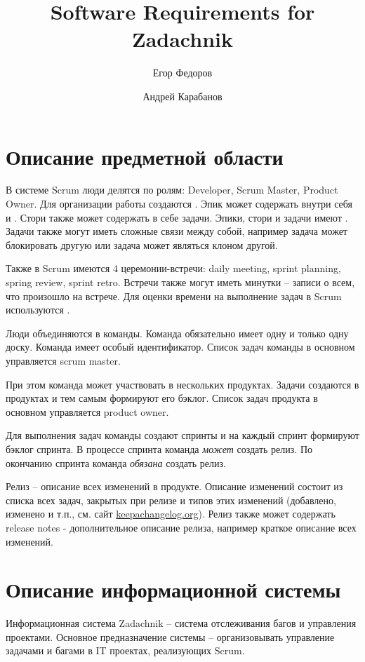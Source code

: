 \documentclass{article}
\author{Егор Федоров \and Андрей Карабанов}
\title{Software Requirements for Zadachnik}
\begin{document}

\tableofcontents

\section{Описание предметной области}
В системе Scrum люди делятся по ролям:
Developer, Scrum Master, Product Owner.
Для организации работы создаются .
Эпик может содержать внутри себя  и
. Стори также может содержать в себе задачи.
Эпики, стори и задачи имеют .
Задачи также могут иметь сложные связи между собой, например
задача может блокировать другую или задача может являться клоном другой.

Также в Scrum имеются 4 церемонии-встречи: daily meeting, sprint
planning, spring review, sprint retro.
Встречи также могут иметь минутки -- записи о всем, что произошло на встрече.
Для оценки времени на выполнение задач в Scrum используются .

Люди объединяются в команды. Команда обязательно имеет одну и только одну доску.
Команда имеет особый идентификатор.
Список задач команды в основном управляется scrum master.

При этом команда может участвовать в нескольких продуктах.
Задачи создаются в продуктах и тем самым формируют его бэклог.
Список задач продукта в основном управляется product owner.

Для выполнения задач команды создают спринты и на каждый
спринт формируют бэклог спринта.
В процессе спринта команда \emph{может} создать релиз.
По окончанию спринта команда \emph{обязана} создать релиз.

Релиз -- описание всех изменений в продукте.
Описание изменений состоит из списка всех задач,
закрытых при релизе и типов этих изменений (добавлено, изменено и т.п., см. сайт \url{keepachangelog.org}).
Релиз также может содержать release notes - дополнительное описание релиза, например
краткое описание всех изменений.

\section{Описание информационной системы}
Информационная система Zadachnik -- система отслеживания багов и
управления проектами.
Основное предназначение системы -- организовывать управление задачами и багами
в IT проектах, реализующих Scrum.
\end{document}
